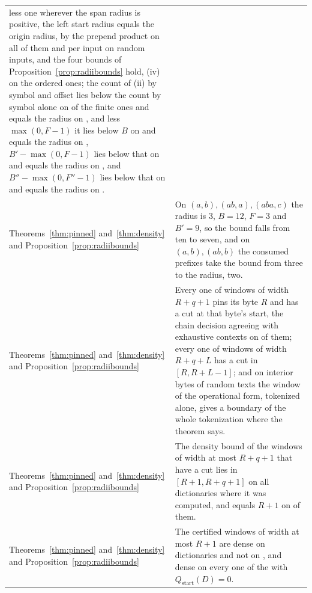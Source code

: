 \documentclass[11pt,a4paper]{article}
\theoremstyle{definition}
\theoremstyle{plain}
\begin{document}
{\begin{longtable}{@{}>{\raggedright\arraybackslash}p{}>{\raggedright\arraybackslash}p{}@{}}
less one wherever the span radius is positive, the left start radius equals the origin radius, by the prepend product on
all of them and per input on \DensityLeftInputs{} random inputs, and the four bounds of
Proposition~\ref{prop:radiibounds} hold, (iv) on the \DensityOrdered{} ordered ones; the count of (ii) by symbol and
offset lies below the count by symbol alone on \DensityOffsetBelow{} of the finite ones and equals the radius on
\DensityOffsetExact{}, and less \(\max(0, F - 1)\) it lies below \(B\) on \DensityJointBelow{} and equals the radius on
\DensityJointExact{}, \(B' - \max(0, F - 1)\) lies below that on \DensitySuffixBelow{} and equals the radius on
\DensitySuffixExact{}, and \(B'' - \max(0, F'' - 1)\) lies below that on \DensityPrefixBelow{} and equals the radius on
\DensityPrefixExact{}. \\
\addlinespace
{\footnotesize Theorems~\ref{thm:pinned} and~\ref{thm:density} and Proposition~\ref{prop:radiibounds}} & On
\((a, b), (ab, a), (aba, c)\) the radius is \(3\), \(B = 12\), \(F = 3\) and \(B' = 9\), so the bound falls from ten to
seven, and on \((a, b), (ab, b)\) the consumed prefixes take the bound from three to the radius, two. \\
\addlinespace
{\footnotesize Theorems~\ref{thm:pinned} and~\ref{thm:density} and Proposition~\ref{prop:radiibounds}} & Every one of
\DensityPinned{} windows of width \(R + q + 1\) pins its byte \(R\) and has a cut at that byte's start, the chain
decision agreeing with exhaustive contexts on \DensityPinnedSampled{} of them; every one of \DensityCuts{} windows of
width \(R + q + L\) has a cut in \([R, R + L - 1]\); and on \DensityConstructive{} interior bytes of random texts the
window of the operational form, tokenized alone, gives a boundary of the whole tokenization where the theorem says. \\
\addlinespace
{\footnotesize Theorems~\ref{thm:pinned} and~\ref{thm:density} and Proposition~\ref{prop:radiibounds}} & The density
bound of the windows of width at most \(R + q + 1\) that have a cut lies in \([R + 1, R + q + 1]\) on all
\DensityBounds{} dictionaries where it was computed, and equals \(R + 1\) on \DensityBoundsTight{} of them. \\
\addlinespace
{\footnotesize Theorems~\ref{thm:pinned} and~\ref{thm:density} and Proposition~\ref{prop:radiibounds}} & The certified
windows of width at most \(R + 1\) are dense on \DensityDense{} dictionaries and not on \DensitySparse{}, and dense on
every one of the \DensityQsZero{} with \(Q_{\mathrm{start}}(D) = 0\). \\

\end{longtable}}
\end{document}
